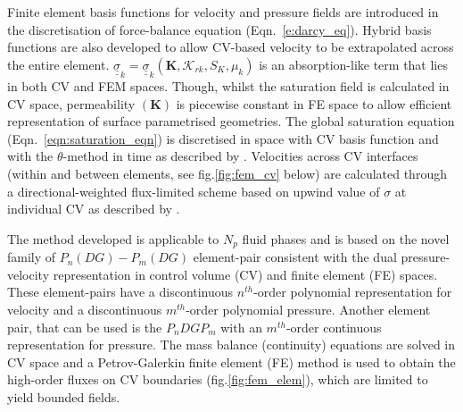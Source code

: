 \documentclass[preprint,authoryear,12pt]{elsarticle}
\begin{document}
\medskip
Finite element basis functions for velocity and pressure fields are introduced in the discretisation of force-balance equation (Eqn.~\ref{e:darcy_eq}). Hybrid basis functions are also developed to allow CV-based velocity to be extrapolated across the entire element. $\underline{\underline{\sigma}}_{k}=\underline{\underline{\sigma}}_{k}\left({\mathbf K}, \mathcal{K}_{rk}, S_{K}, \mu_{k}\right)$ is an absorption-like term that lies in both CV and FEM spaces. Though, whilst the saturation field is calculated in CV space, permeability $\left({\mathbf K}\right)$ is piecewise constant in FE space to allow efficient representation of surface parametrised geometries. The global saturation equation (Eqn.~\ref{eqn:saturation_eqn}) is discretised in space with CV basis function and with the $\theta$-method in time as described by \citet{gomes_book_2012}. Velocities across CV interfaces (within and between elements, see fig.\ref{fig:fem_cv} below) are calculated through a directional-weighted flux-limited scheme based on upwind value of $\sigma$ at individual CV as described by \citet{jackson_2013}.

 The method developed is applicable to $N_{p}$ fluid phases and is based on the novel family of $P_{n}(DG)-P_{m}(DG)$ element-pair consistent with the dual pressure-velocity representation in control volume (CV) and finite element (FE) spaces. These element-pairs have a discontinuous $n^{th}$-order polynomial representation for velocity and a discontinuous $m^{th}$-order polynomial pressure. Another element pair, that can be used is the $P_{n}DGP_{m}$ with an $m^{th}$-order continuous representation for pressure. The mass balance (continuity) equations are solved in CV space and a Petrov-Galerkin finite element (FE) method is used to obtain the high-order fluxes on CV boundaries (fig.\ref{fig:fem_elem}), which are limited to yield bounded fields.
\end{document}
